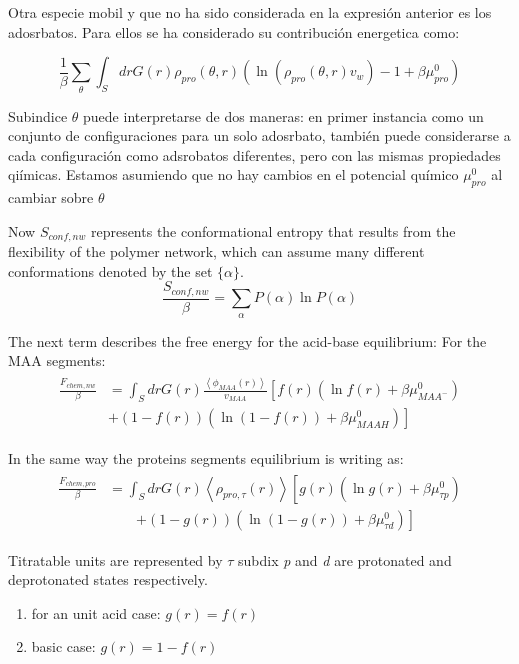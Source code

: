 Otra especie mobil y que no ha sido considerada en la expresi\'on anterior es los adosrbatos. Para ellos se ha considerado su contribuci\'on energetica como:

\begin{equation}
\frac{1}{\beta}\sum_{\theta}\int_S{dr G(r)\rho_{pro}(\theta,r)\left(\ln \left(\rho_{pro}(\theta,r)v_w\right) -1 + \beta\mu^0_{pro} \right)}
\end{equation}

Subindice $\theta$ puede interpretarse de dos maneras: en primer instancia como un conjunto de configuraciones para un solo adosrbato, tambi\'en puede considerarse a cada configuraci\'on como adsrobatos diferentes, pero con las mismas propiedades qi\'imicas.
Estamos asumiendo que no hay cambios en el potencial qu\'imico  $\mu^0_{pro}$ al cambiar sobre $\theta$ 

Now $S_{conf,nw}$ represents the conformational entropy that results from the flexibility of the polymer network, which can assume many different conformations denoted by the set $\{\alpha\}$. 
\begin{equation}
\frac{S_{conf,nw}}{\beta} = \sum_{\alpha}{P(\alpha)\ln P(\alpha)}
\end{equation}

The next term describes the free energy for the acid-base equilibrium:
For the MAA segments:
\begin{align}
\begin{aligned}
\frac{F_{chem,nw}}{\beta} &= \int_S drG(r) \frac{\left<\phi_{MAA}(r)\right>}{v_{MAA}} \left[f(r)(\ln f(r)+ \beta\mu^0_{MAA^-})\right.\\
&\left.+(1-f(r))(\ln (1-f(r))+\beta\mu^0_{MAAH})\right]    
\end{aligned}
\end{align} 

In the same way the proteins segments equilibrium is writing as:
\begin{align}
\begin{aligned}
\frac{F_{chem,pro}}{\beta} &=\int_S drG(r) \left<\rho_{pro,\tau}(r)\right> \left[g(r)(\ln g(r)+ \beta\mu^0_{\tau p})\right.\\
&\qquad\left.+(1-g(r))(\ln (1-g(r))+\beta\mu^0_{\tau d})\right]   
\end{aligned}
\end{align} 

Titratable units are represented by  $\tau$ subdix \textit{p} and \textit{d} are protonated and deprotonated states respectively. 
\begin{enumerate}
	\item for an unit acid case: $g(r) = f(r)$
	\item basic case: $g(r) = 1-f(r)$
\end{enumerate}

